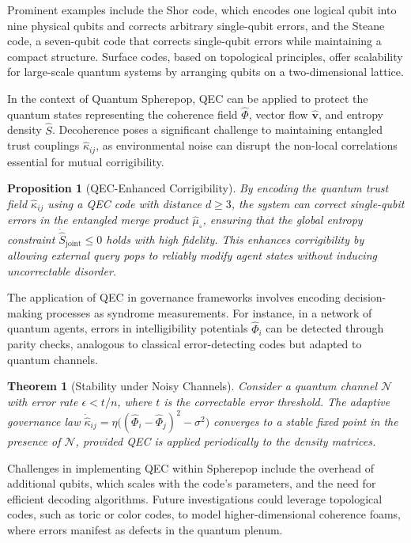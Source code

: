 \documentclass[12pt]{article}
\newtheorem{proposition}{Proposition}
\newtheorem{theorem}{Theorem}
\begin{document}
Prominent examples include the Shor code, which encodes one logical qubit into nine physical qubits and corrects arbitrary single-qubit errors, and the Steane code, a seven-qubit code that corrects single-qubit errors while maintaining a compact structure. Surface codes, based on topological principles, offer scalability for large-scale quantum systems by arranging qubits on a two-dimensional lattice.

In the context of Quantum Spherepop, QEC can be applied to protect the quantum states representing the coherence field \(\hat{\Phi}\), vector flow \(\hat{\mathbf{v}}\), and entropy density \(\hat{S}\). Decoherence poses a significant challenge to maintaining entangled trust couplings \(\hat{\kappa}_{ij}\), as environmental noise can disrupt the non-local correlations essential for mutual corrigibility.

\begin{proposition}[QEC-Enhanced Corrigibility]
By encoding the quantum trust field \(\hat{\kappa}_{ij}\) using a QEC code with distance \(d \geq 3\), the system can correct single-qubit errors in the entangled merge product \(\hat{\mu}_{\circ}\), ensuring that the global entropy constraint \(\dot{\hat{S}}_{\text{joint}} \leq 0\) holds with high fidelity. This enhances corrigibility by allowing external query pops to reliably modify agent states without inducing uncorrectable disorder.
\end{proposition}

The application of QEC in governance frameworks involves encoding decision-making processes as syndrome measurements. For instance, in a network of quantum agents, errors in intelligibility potentials \(\hat{\Phi}_i\) can be detected through parity checks, analogous to classical error-detecting codes but adapted to quantum channels.

\begin{theorem}[Stability under Noisy Channels]
Consider a quantum channel \(\mathcal{N}\) with error rate \(\epsilon < t/n\), where \(t\) is the correctable error threshold. The adaptive governance law \(\dot{\hat{\kappa}}_{ij} = \eta \big( (\hat{\Phi}_i - \hat{\Phi}_j)^2 - \sigma^2 \big)\) converges to a stable fixed point in the presence of \(\mathcal{N}\), provided QEC is applied periodically to the density matrices.
\end{theorem}

Challenges in implementing QEC within Spherepop include the overhead of additional qubits, which scales with the code's parameters, and the need for efficient decoding algorithms. Future investigations could leverage topological codes, such as toric or color codes, to model higher-dimensional coherence foams, where errors manifest as defects in the quantum plenum.
\end{document}
